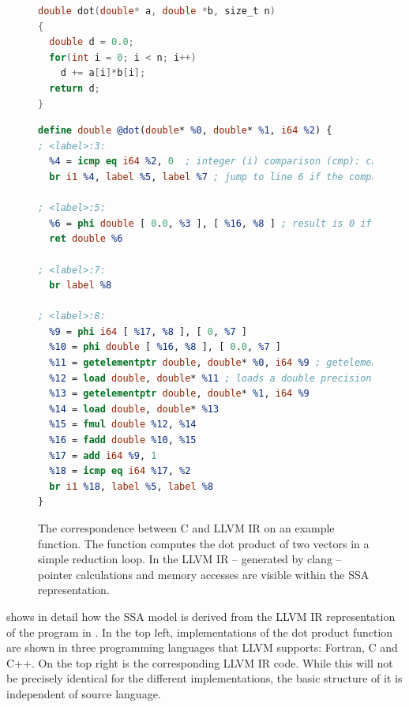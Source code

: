 \begin{figure}[p]
\vspace{-0.09cm}
\begin{lstlisting}[language=C,captionpos=t,title=
   {{\bf(a)} {} C source code of a {\tt dot} product function implementation
    \leftskip=0pt}]
double dot(double* a, double *b, size_t n)
{
  double d = 0.0;
  for(int i = 0; i < n; i++)
    d += a[i]*b[i];
  return d;
}
\end{lstlisting}
\vspace{-0.09cm}
\begin{lstlisting}[language=LLVM,breaklines=true,captionpos=t,title=
   {{\bf(b)} {} LLVM IR representation of the same {\tt dot} product function
    \leftskip=0pt}]
define double @dot(double* %0, double* %1, i64 %2) {
; <label>:3:
  %4 = icmp eq i64 %2, 0  ; integer (i) comparison (cmp): check if register %2 is equal (eq) to constant zero
  br i1 %4, label %5, label %7 ; jump to line 6 if the comparison held, otherwise jump to line 10 instead

; <label>:5:
  %6 = phi double [ 0.0, %3 ], [ %16, %8 ] ; result is 0 if the phi node was reached from line 4, otherwise it was reached from line 24 and the result is taken from %16
  ret double %6

; <label>:7:
  br label %8

; <label>:8:
  %9 = phi i64 [ %17, %8 ], [ 0, %7 ]
  %10 = phi double [ %16, %8 ], [ 0.0, %7 ]
  %11 = getelementptr double, double* %0, i64 %9 ; getelementpointer calculates memory addresses, here it computes the address of the %9-th value in the array %0
  %12 = load double, double* %11 ; loads a double precision floating point value from the calculated address
  %13 = getelementptr double, double* %1, i64 %9
  %14 = load double, double* %13
  %15 = fmul double %12, %14
  %16 = fadd double %10, %15
  %17 = add i64 %9, 1
  %18 = icmp eq i64 %17, %2
  br i1 %18, label %5, label %8
}
\end{lstlisting}
\caption{The correspondence between C and LLVM IR on an example function.
         The function computes the dot product of two vectors in a simple
         reduction loop.
         In the LLVM IR -- generated by clang -- pointer calculations and memory
         accesses are visible within the SSA representation.}
\label{llvmirexample}
\end{figure}

\newpage

     shows in detail how the SSA model is derived from the
    LLVM IR representation of the program in .
    In the top left, implementations of the dot product function are shown
    in three programming languages that LLVM supports: Fortran, C and C++.
    On the top right is the corresponding LLVM IR code.
    While this will not be precisely identical for the different
    implementations, the basic structure of it is independent of source
    language.

